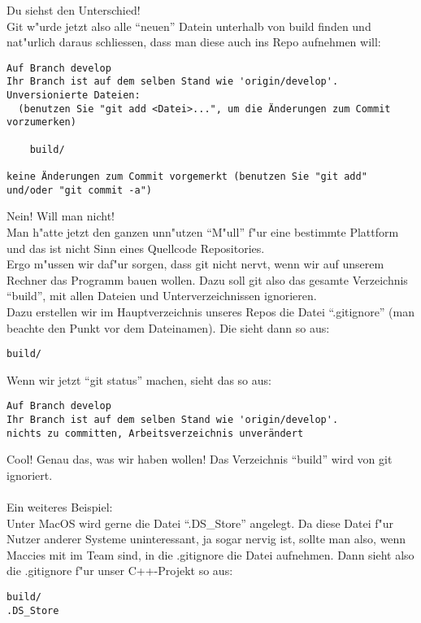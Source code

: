 \documentclass[german,a4paper]{report}
\begin{document}
Du siehst den Unterschied!\\

Git w"urde jetzt also alle ``neuen'' Datein unterhalb von build finden
und nat"urlich daraus schliessen, dass man diese auch ins Repo
aufnehmen will:
\begin{verbatim}
Auf Branch develop
Ihr Branch ist auf dem selben Stand wie 'origin/develop'.
Unversionierte Dateien:
  (benutzen Sie "git add <Datei>...", um die Änderungen zum Commit vorzumerken)

	build/

keine Änderungen zum Commit vorgemerkt (benutzen Sie "git add" und/oder "git commit -a")
\end{verbatim}

Nein! Will man nicht!\\
Man h"atte jetzt den ganzen unn"utzen ``M"ull'' f"ur eine bestimmte
Plattform und das ist nicht Sinn eines Quellcode Repositories.\\
Ergo m"ussen wir daf"ur sorgen, dass git nicht nervt, wenn wir auf
unserem Rechner das Programm bauen wollen. Dazu soll git also das
gesamte Verzeichnis ``build'', mit allen Dateien und Unterverzeichnissen
ignorieren.\\
Dazu erstellen wir im Hauptverzeichnis unseres Repos die Datei
``.gitignore'' (man beachte den Punkt vor dem Dateinamen). Die
sieht dann so aus:
\begin{verbatim}
build/
\end{verbatim}

Wenn wir jetzt ``git status'' machen, sieht das so aus:
\begin{verbatim}
Auf Branch develop
Ihr Branch ist auf dem selben Stand wie 'origin/develop'.
nichts zu committen, Arbeitsverzeichnis unverändert
\end{verbatim}

Cool! Genau das, was wir haben wollen! Das Verzeichnis ``build'' wird
von git ignoriert.\\
\\
Ein weiteres Beispiel:\\
Unter MacOS wird gerne die Datei ``.DS\_Store'' angelegt. Da diese
Datei f"ur Nutzer anderer Systeme uninteressant, ja sogar nervig
ist, sollte man also, wenn Maccies mit im Team sind, in die
.gitignore die Datei aufnehmen. Dann sieht also die .gitignore
f"ur unser C++-Projekt so aus:
\begin{verbatim}
build/
.DS_Store
\end{verbatim}
\end{document}
